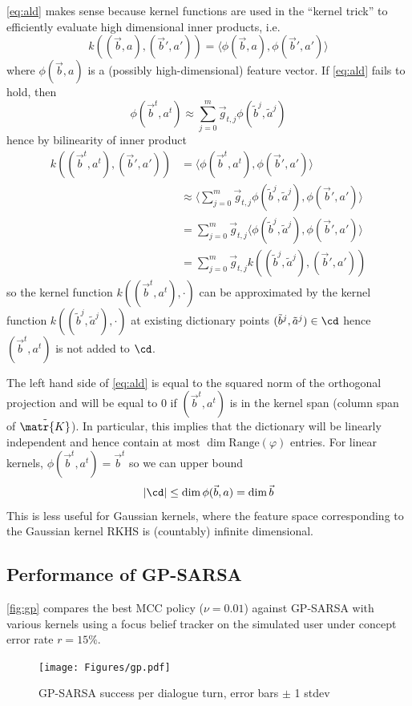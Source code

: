 \documentclass[a4paper,oneside,reqno]{amsart}
\begin{document}
\autoref{eq:ald} makes sense because kernel functions are used in the ``kernel trick''
to efficiently evaluate high dimensional inner products, i.e.
\[
  k((\vec{b},a),(\vec{b}',a')) = \langle \phi(\vec{b},a), \phi(\vec{b}',a') \rangle
\]
where $\phi(\vec{b},a)$ is a (possibly high-dimensional) feature vector. If
\autoref{eq:ald} fails to hold, then
\[
  \phi(\vec{b}^t, a^t) \approx \sum_{j=0}^m \vec{g}_{t,j} \phi(\tilde{b}^j, \tilde{a}^j)
\]
hence by bilinearity of inner product
\begin{align}
  k((\vec{b}^t, a^t), (\vec{b}', a')) \nonumber
  &= \langle \phi(\vec{b}^t, a^t), \phi(\vec{b}', a') \rangle \nonumber\\
  &\approx \langle \sum_{j=0}^m \vec{g}_{t,j} \phi(\tilde{b}^j, \tilde{a}^j), \phi(\vec{b}', a') \rangle \nonumber\\
  &= \sum_{j=0}^m \vec{g}_{t,j} \langle \phi(\tilde{b}^j, \tilde{a}^j), \phi(\vec{b}', a') \rangle \nonumber\\
  &= \sum_{j=0}^m \vec{g}_{t,j} k((\tilde{b}^j, \tilde{a}^j), (\vec{b}', a')) \nonumber
\end{align}
so the kernel function $k((\vec{b}^t, a^t), \cdot)$ can be approximated by the
kernel function $k((\tilde{b}^j, \tilde{a}^j), \cdot)$ at existing dictionary
points $(\tilde{b}^j, \tilde{a}^j) \in \cd$ hence $(\vec{b}^t, a^t)$ is not added
to $\cd$.

The left hand side of \autoref{eq:ald} is equal to the squared norm of the
orthogonal projection and will be equal to $0$ if $(\vec{b}^t, a^t)$ is in the
kernel span (column span of $\tilde{\matr{K}}$). In particular, this implies
that the dictionary will be linearly independent and hence contain at most
$\dim \text{Range}(\varphi)$ entries.  For linear kernels,
$\phi(\vec{b}^t, a^t) = \vec{b}^t$ so we can upper bound
\[
  |\cd| \leq \dim \phi(\vec{b},a) = \dim \vec{b}
\]
This is less useful for Gaussian kernels, where the feature space corresponding
to the Gaussian kernel RKHS is (countably) infinite dimensional.

\subsection{Performance of GP-SARSA}

\autoref{fig:gp} compares the best MCC policy ($\nu=0.01$) against GP-SARSA
with various kernels using a focus belief tracker on the simulated user under
concept error rate $r=15\%$.

\begin{figure}[ht!]
  \begin{center}
    \texttt{[image: Figures/gp.pdf]}
  \end{center}
  \caption{GP-SARSA success per dialogue turn, error bars $\pm$ 1 stdev}
  \label{fig:gp}
\end{figure}
\end{document}
